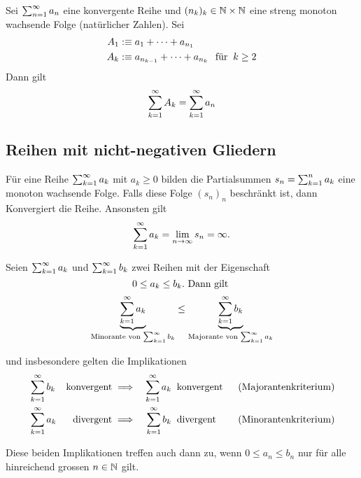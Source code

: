 \begin{thm}
	Sei $\sumninfty a_n$ eine konvergente Reihe und $(n_k)_k \in \nat \times \nat$ eine streng monoton wachsende Folge (natürlicher Zahlen).
	Sei
	\begin{equation}
		\begin{aligned}
			A_1 &: \equiv a_1 + \cdots + a_{n_1} \\
			A_k &: \equiv a_{n_{k-1}} + \cdots + a_{n_k} \fuer k \geq 2
		\end{aligned}
	\end{equation}
	Dann gilt
	\begin{equation}
		\sumkinfty A_k = \sumkinfty a_n
	\end{equation}
\end{thm}

\subsection{Reihen mit nicht-negativen Gliedern}

\begin{thm}
	Für eine Reihe $\sumkinfty a_k$ mit $a_k \geq 0$ bilden die Partialsummen $s_n=\sumkn a_k$ eine monoton wachsende Folge. Falls diese Folge $(s_n)_n$ beschränkt ist, dann Konvergiert die Reihe. Ansonsten gilt
	\begin{equation}
		\sumkinfty a_k = \limninfty s_n = \infty.
	\end{equation}
\end{thm}

\begin{thm}[Vergleichssatz]

	Seien $\sumkinfty a_k$ und $\sumkinfty b_k$ zwei Reihen mit der Eigenschaft
	\begin{equation}
		0\leq a_k \leq b_k. $ Dann gilt $
	\end{equation}
	\begin{equation}
	 	\underbrace{\sumkinfty a_k}_{\text{Minorante von $\sumkinfty b_k$}}  \leq \underbrace{\sumkinfty b_k}_{\text{Majorante von $\sumkinfty a_k$}}
	\end{equation}

	und insbesondere gelten die Implikationen
	\begin{equation}
		\begin{aligned}
			&\sumkinfty b_k
			&\text{konvergent}
			&\implies
			&\sumkinfty a_k
			&\mytext{konvergent}
			&\text{(Majorantenkriterium)} \\
			&\sumkinfty a_k
			&\text{divergent}
			&\implies
			&\sumkinfty b_k
			&\mytext{divergent}
			&\text{(Minorantenkriterium)}
		\end{aligned}
	\end{equation}

	Diese beiden Implikationen treffen auch dann zu, wenn $0\leq a_n \leq b_n$ nur für alle hinreichend grossen $n \in \nat$ gilt.
\end{thm}

